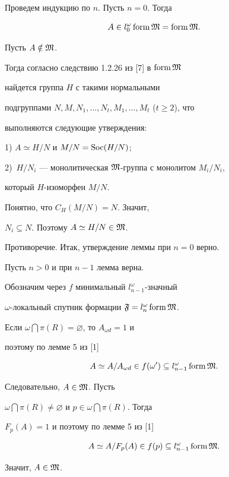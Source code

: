 \begin{pf}


Проведем индукцию по $n$. Пусть $n=0$. Тогда


$$


A \in l_0^{\omega} \form \frak{M}=\form \frak{M}.


$$


Пусть $A \notin \frak{M}$.


Тогда согласно следствию 1.2.26 из [7] в $\operatorname{form} \frak{M}$


найдется группа $H$ с такими нормальными


подгруппами $N,M,N_1,\dotsc,N_t,M_1,\dotsc,M_t$ ($t \ge 2$), что


выполняются следующие утверждения:





1) $A \simeq H/N$ и $M/N={\operatorname{Soc}}(H/N)$;


2)~$H/N_i$ --- монолитическая $\frak{M}$-группа с монолитом $M_i/N_i$,


который $H$-изоморфен $M/N$.





\noindent{}Понятно, что $C_H(M/N)=N$. Значит,


$N_i \subseteq N$. Поэтому $A \simeq H/N \in \frak{M}$.


Противоречие. Итак, утверждение леммы при $n=0$ верно.





Пусть $n>0$ и при $n-1$ лемма верна.





Обозначим через $f$ минимальный $l_{n-1}^{\omega}$-значный


$\omega$-локальный спутник формации $\frak{F}=l_n^{\omega}\operatorname{form}\frak{M}$.


Если $\omega\bigcap\pi(R)=\varnothing$, то $A_{\omega d}=1$ и


поэтому по лемме 5 из [1]


$$


A\simeq A/A_{\omega d}\in f(\omega ')\subseteq


l_{n-1}^{\omega}\form\frak{M}.


$$


Следовательно, $A\in\frak{M}$. Пусть


$\omega\bigcap\pi(R)\ne\varnothing$ и $p\in\omega\bigcap\pi(R)$. Тогда


$F_p(A)=1$ и поэтому по лемме 5 из [1]


$$


A\simeq A/F_p(A)\in f(p)\subseteq l_{n-1}^{\omega}\form\frak{M}.


$$


Значит, $A\in\frak{M}$.


\end{pf}





